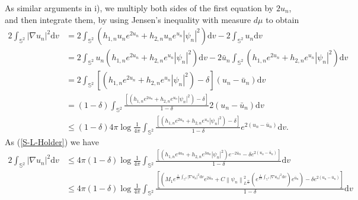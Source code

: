 \documentclass[a4paper, 12pt]{article}
\begin{document}
\begin{enumerate}[label=\roman*), leftmargin=*]
	As similar arguments in i), we multiply both sides of the first equation by $2u_n$, and then integrate them,  by using Jensen's inequality with  measure $d\mu$ to obtain
	\[\begin{aligned}
		2\int_{{\mathbb{S}^2}} {{{\left| {\nabla u_n} \right|}^2}{\text{d}{v}}} & = 2\int_{{\mathbb{S}^2}} {\left( {{h_{1,n}}u_n{e^{2u_n}} +{h_{2,n}} u_n{e^{u_n}}{{\left| \psi_n  \right|}^2}} \right){\text{d}{v}}}  - 2\int_{{\mathbb{S}^2}} u_n{\text{d}{v}}  \\
		&= 2\int_{{\mathbb{S}^2}} {u_n\left( {{h_{1,n}}{e^{2u_n}} +{h_{2,n}} {e^{u_n}}{{\left| \psi_n  \right|}^2}} \right){\text{d}{v}}}  - 2\bar u_n\int_{{\mathbb{S}^2}} {\left( {{h_{1,n}}{e^{2u_n}} +{h_{2,n}} {e^{u_n}}{{\left| \psi_n  \right|}^2}} \right){\text{d}{v}}}   \\
		&= 2\int_{{\mathbb{S}^2}} {\left[ {\left( {{h_{1,n}}{e^{2u_n}} +{h_{2,n}} {e^{u_n}}{{\left| \psi_n  \right|}^2}} \right) - \delta } \right]\left( {u_n - \bar u_n} \right){\text{d}{v}}}   \\
		&= \left( {1 - \delta } \right)\int_{{\mathbb{S}^2}} {\frac{{\left[ {\left( {{h_{1,n}}{e^{2u_n}} +{h_{2,n}} {e^{u_n}}{{\left| \psi_n  \right|}^2}} \right) - \delta } \right]}}{{1 - \delta }}2\left( {u_n - \bar u_n} \right){\text{d}{v}}}   \\
		&\leq \left( {1 - \delta } \right)4\pi\log\frac{1}{4\pi} \int_{{\mathbb{S}^2}} {\frac{{\left[ {\left( {{h_{1,n}}{e^{2u_n}} +{h_{2,n}} {e^{u_n}}{{\left| \psi_n  \right|}^2}} \right) - \delta } \right]}}{{1 - \delta }}{e^{2\left( {u_n - \bar u_n} \right)}}{\text{d}{v}}}.
	\end{aligned} \]
	As (\ref{S-L-Holder}) we have
	\[\begin{aligned}
		2\int_{{\mathbb{S}^2}} {{{\left| {\nabla u_n} \right|}^2}{\text{d}{v}}}  								 &\leq 4\pi{\left( {1 - \delta } \right)}\log \frac{1}{4\pi}\int_{{\mathbb{S}^2}} {\frac{{\left[ {\left( {{h_{1,n}}{e^{4u_n}} +{h_{2,n}} {e^{3u_n}}{{\left| \psi_n  \right|}^2}} \right){e^{ - 2\bar u_n}} - \delta {e^{2\left( {u_n - \bar u_n} \right)}}} \right]}}{{1 - \delta }}{\text{d}{v}}}   \\
		&\leq4\pi {\left( {1 - \delta } \right)}\log \frac{1}{{4\pi }}\int_{{\mathbb{S}^2}} {\frac{{\left[ {\left( {M_1{e^{\frac{1}{2\pi}\int_{{\mathbb{S}^2}} {{{\left| {\nabla {u_n}} \right|}^2}{\text{d}}v} }}{e^{2{{\bar u}_n}}} + C\left\| {{\psi _n}} \right\|_{{L^{\frac{{32}}{7}}}}^2\left( {{e^{\frac{1}{{2\pi }}\int_{{\mathbb{S}^2}} {{{\left| {\nabla {u_n}} \right|}^2}{\text{d}}v} }}} \right){e^{{{\bar u}_n}}}} \right) - \delta {e^{2\left( {{u_n} - {{\bar u}_n}} \right)}}} \right]}}{{1 - \delta }}{\text{d}}v} \\

\end{aligned}\]
\end{enumerate}
\end{document}
